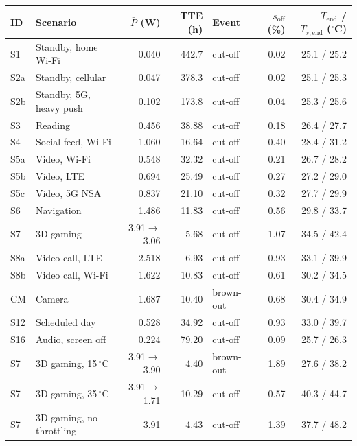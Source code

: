 \begin{tabular}{llrrlrr}
\toprule
ID & Scenario & $\bar P$ (W) & TTE (h) & Event & $s_\mathrm{off}$ (\%) & $T_\mathrm{end}$ / $T_{s,\mathrm{end}}$ ($^\circ$C) \\
\midrule
S1 & Standby, home Wi-Fi & 0.040 & 442.7 & cut-off & 0.02 & 25.1 / 25.2 \\
S2a & Standby, cellular & 0.047 & 378.3 & cut-off & 0.02 & 25.1 / 25.3 \\
S2b & Standby, 5G, heavy push & 0.102 & 173.8 & cut-off & 0.04 & 25.3 / 25.6 \\
S3 & Reading & 0.456 & 38.88 & cut-off & 0.18 & 26.4 / 27.7 \\
S4 & Social feed, Wi-Fi & 1.060 & 16.64 & cut-off & 0.40 & 28.4 / 31.2 \\
S5a & Video, Wi-Fi & 0.548 & 32.32 & cut-off & 0.21 & 26.7 / 28.2 \\
S5b & Video, LTE & 0.694 & 25.49 & cut-off & 0.27 & 27.2 / 29.0 \\
S5c & Video, 5G NSA & 0.837 & 21.10 & cut-off & 0.32 & 27.7 / 29.9 \\
S6 & Navigation & 1.486 & 11.83 & cut-off & 0.56 & 29.8 / 33.7 \\
S7 & 3D gaming & 3.91$\to$3.06 & 5.68 & cut-off & 1.07 & 34.5 / 42.4 \\
S8a & Video call, LTE & 2.518 & 6.93 & cut-off & 0.93 & 33.1 / 39.9 \\
S8b & Video call, Wi-Fi & 1.622 & 10.83 & cut-off & 0.61 & 30.2 / 34.5 \\
CM & Camera & 1.687 & 10.40 & brown-out & 0.68 & 30.4 / 34.9 \\
S12 & Scheduled day & 0.528 & 34.92 & cut-off & 0.93 & 33.0 / 39.7 \\
S16 & Audio, screen off & 0.224 & 79.20 & cut-off & 0.09 & 25.7 / 26.3 \\
S7 & 3D gaming, 15\,$^\circ$C & 3.91$\to$3.90 & 4.40 & brown-out & 1.89 & 27.6 / 38.2 \\
S7 & 3D gaming, 35\,$^\circ$C & 3.91$\to$1.71 & 10.29 & cut-off & 0.57 & 40.3 / 44.7 \\
S7 & 3D gaming, no throttling & 3.91 & 4.43 & cut-off & 1.39 & 37.7 / 48.2 \\
\bottomrule
\end{tabular}

